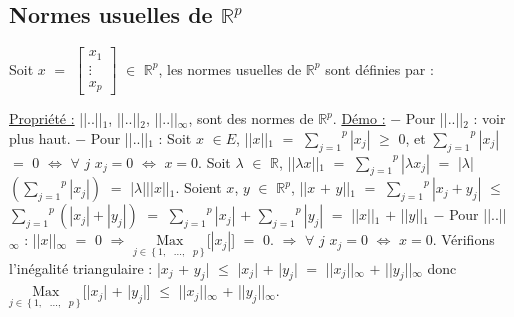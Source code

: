 \documentclass{article}
\begin{document}
\subsection{Normes usuelles de $\mathbb{R}^p$}
Soit $x$ $=$ $
\begin{bmatrix}
	x_1 \\
	\vdots \\
	x_p
\end{bmatrix}
$
$\in$ $\mathbb{R}^p$, les normes usuelles de $\mathbb{R}^p$ sont définies par :

\smallbreak
{}
\smallbreak
\underline{Propriété :} ||..||$_1$, ||..||$_2$, ||..||$_{\infty}$, sont des normes de $\mathbb{R}^p$.
\smallbreak
\underline{Démo :}
\parindent=1cm
\smallbreak
$-$ Pour ||..||$_2$ : voir plus haut.
\smallbreak
$-$ Pour ||..||$_1$ :
\smallbreak
Soit $x$ $\in E$, ||$x$||$_1$ $=$ $\overset{p}{\underset{j = 1}{\sum}}|x_j|$ $\geqslant$ $0$, et $\overset{p}{\underset{j = 1}{\sum}}|x_j|$ $=$ $0$ $\Longleftrightarrow$ $\forall$ $j$ $x_j = 0$ $\Longleftrightarrow$ $x = 0$.
\smallbreak
Soit $\lambda$ $\in$ $\mathbb{R}$, ||$\lambda x$||$_1$ $=$ $\overset{p}{\underset{j = 1}{\sum}}|\lambda x_j|$ $=$ |$\lambda$|$(\overset{p}{\underset{j = 1}{\sum}}|x_j|)$ $=$ |$\lambda$|||$x$||$_1$.
\smallbreak
Soient $x$, $y$ $\in$ $\mathbb{R}^p$, ||$x$ $+$ $y$||$_1$ $=$ $\overset{p}{\underset{j = 1}{\sum}}|x_j + y_j|$ $\leqslant$ $\overset{p}{\underset{j = 1}{\sum}}(|x_j| + |y_j|)$ $=$ $\overset{p}{\underset{j = 1}{\sum}}|x_j|$ $+$ $\overset{p}{\underset{j = 1}{\sum}}|y_j|$ $=$ ||$x$||$_1$ $+$ ||$y$||$_1$
\smallbreak
$-$ Pour ||..||$_{\infty}$ :
\smallbreak
||$x$||$_{\infty}$ $=$ 0 $\Longrightarrow$ $\underset{j \in \left\{ 1,\text{ }...,\text{ }p \right\} }{\text{Max}}$[$|x_j|$] $=$ $0$. $\Longrightarrow$ $\forall$ $j$ $x_j = 0$ $\Longleftrightarrow$ $x = 0$.
\smallbreak
Vérifions l'inégalité triangulaire : |$x_j$ + $y_j$| $\leqslant$ |$x_j$| + |$y_j$| $=$ ||$x_j$||$_{\infty}$ $+$ ||$y_j$||$_{\infty}$ donc \smallbreak $\underset{j \in \left\{ 1,\text{ }...,\text{ }p \right\} }{\text{Max}}$[|$x_j$| + |$y_j$|] $\leqslant$ ||$x_j$||$_{\infty}$ + ||$y_j$||$_{\infty}$.
\end{document}
